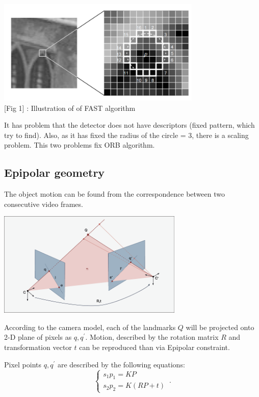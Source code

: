 \begin{center}
    \includegraphics[height=5cm]{FAST_example.png}\\[1cm]
    [Fig 1] : Illustration of of FAST algorithm 
\end{center}

It has problem that the detector does not have descriptors (fixed pattern, which try to find). Also, as it has fixed the radius of the circle = 3, there is a scaling problem. This two problems fix ORB algorithm.

\subsection{Epipolar geometry}

The object motion can be found from the correspondence between two consecutive video frames. 
\begin{center}
    \includegraphics[height=5cm]{nc.png}\\[1cm]
\end{center}

According to the camera model, each of the landmarks $Q$ will be projected onto 2-D plane of pixels as $q, q^{\prime}$. Motion, described by the rotation matrix $R$ and transformation vector $t$ can be reproduced than via Epipolar constraint. 

Pixel points $q, q^{\prime}$ are described by the following equations:
\begin{equation}
    \begin{cases}
      s_{1} p_{1} = K P\\
      s_{2} p_{2} = K(RP + t)
    \end{cases}\,.
\end{equation}

